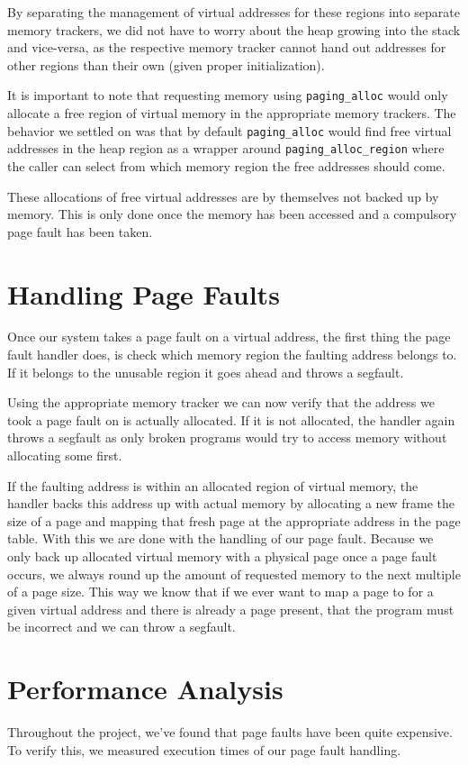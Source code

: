 By separating the management of virtual addresses for these regions into separate memory trackers,
we did not have to worry about the heap growing into the stack and vice-versa, as the respective 
memory tracker cannot hand out addresses for other regions than their own (given proper initialization).

It is important to note that requesting memory using \texttt{paging_alloc} would only allocate a free region
of virtual memory in the appropriate memory trackers. The behavior we settled on was that by default
\texttt{paging_alloc} would find free virtual addresses in the heap region as a wrapper around
\texttt{paging_alloc_region} where the caller can select from which memory region the free addresses should come.

These allocations of free virtual addresses are by themselves not backed up by memory. This is only
done once the memory has been accessed and a compulsory page fault has been taken.

\section{Handling Page Faults}
Once our system takes a page fault on a virtual address, the first thing the page fault handler does,
is check which memory region the faulting address belongs to. If it belongs to the unusable region
it goes ahead and throws a segfault.

Using the appropriate memory tracker we can now verify that the address we took a page fault on is actually
allocated. If it is not allocated, the handler again throws a segfault as only broken programs would try to
access memory without allocating some first.

If the faulting address is within an allocated region of virtual memory, the handler backs this address up
with actual memory by allocating a new frame the size of a page and mapping that fresh page at the appropriate
address in the page table. With this we are done with the handling of our page fault. Because we only
back up allocated virtual memory with a physical page once a page fault
occurs, we always round up the amount of requested memory to the next multiple of a page size. This way
we know that if we ever want to map a page to for a given virtual address and there is already a page
present, that the program must be incorrect and we can throw a segfault.

\section{Performance Analysis}
Throughout the project, we've found that page faults have been quite expensive. To verify this,
we measured execution times of our page fault handling.

